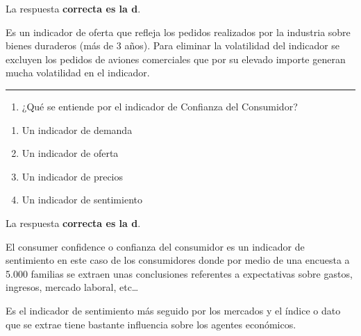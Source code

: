 \documentclass[
  letterpaper,
  DIV=11,
  numbers=noendperiod]{scrreprt}
\providecommand{\tightlist}{%
  \setlength{\itemsep}{0pt}\setlength{\parskip}{0pt}}\usepackage{longtable,booktabs,array}
\begin{document}
\begin{tcolorbox}[enhanced jigsaw, left=2mm, opacityback=0, colback=white, breakable, arc=.35mm, bottomrule=.15mm, rightrule=.15mm, toprule=.15mm, leftrule=.75mm, colframe=quarto-callout-tip-color-frame]
\begin{minipage}[t]{5.5mm}
\textcolor{quarto-callout-tip-color}{\faLightbulb}
\end{minipage}%
\begin{minipage}[t]{\textwidth - 5.5mm}

La respuesta \textbf{correcta es la d}.

Es un indicador de oferta que refleja los pedidos realizados por la
industria sobre bienes duraderos (más de 3 años). Para eliminar la
volatilidad del indicador se excluyen los pedidos de aviones comerciales
que por su elevado importe generan mucha volatilidad en el indicador.

\end{minipage}%
\end{tcolorbox}

\begin{center}\rule{0.5\linewidth}{0.5pt}\end{center}

\begin{enumerate}
\def\labelenumi{\arabic{enumi}.}
\setcounter{enumi}{33}
\tightlist
\item
  ¿Qué se entiende por el indicador de Confianza del Consumidor?
\end{enumerate}

\begin{enumerate}
\def\labelenumi{\alph{enumi})}
\item
  Un indicador de demanda
\item
  Un indicador de oferta
\item
  Un indicador de precios
\item
  Un indicador de sentimiento
\end{enumerate}

\begin{tcolorbox}[enhanced jigsaw, left=2mm, opacityback=0, colback=white, breakable, arc=.35mm, bottomrule=.15mm, rightrule=.15mm, toprule=.15mm, leftrule=.75mm, colframe=quarto-callout-tip-color-frame]
\begin{minipage}[t]{5.5mm}
\textcolor{quarto-callout-tip-color}{\faLightbulb}
\end{minipage}%
\begin{minipage}[t]{\textwidth - 5.5mm}

La respuesta \textbf{correcta es la d}.

El consumer confidence o confianza del consumidor es un indicador de
sentimiento en este caso de los consumidores donde por medio de una
encuesta a 5.000 familias se extraen unas conclusiones referentes a
expectativas sobre gastos, ingresos, mercado laboral, etc\ldots{}

Es el indicador de sentimiento más seguido por los mercados y el índice
o dato que se extrae tiene bastante influencia sobre los agentes
económicos.

\end{minipage}%
\end{tcolorbox}
\end{document}
